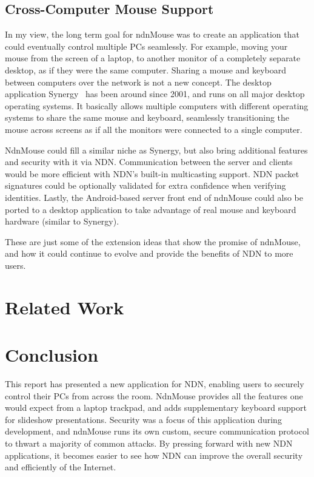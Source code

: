 \documentclass{sig-alternate}
\renewcommand\_{\textunderscore\allowbreak}  %
\begin{document}
\subsection{Cross-Computer Mouse Support}
\label{sec:crossCompMouseSupport}
In my view, the long term goal for ndnMouse was to create an application that could eventually control multiple PCs seamlessly. For example, moving your mouse from the screen of a laptop, to another monitor of a completely separate desktop, as if they were the same computer. Sharing a mouse and keyboard between computers over the network is not a new concept. The desktop application Synergy~\cite{synergy} has been around since 2001, and runs on all major desktop operating systems. It basically allows multiple computers with different operating systems to share the same mouse and keyboard, seamlessly transitioning the mouse across screens as if all the monitors were connected to a single computer.

NdnMouse could fill a similar niche as Synergy, but also bring additional features and security with it via NDN. Communication between the server and clients would be more efficient with NDN's built-in multicasting support. NDN packet signatures could be optionally validated for extra confidence when verifying identities. Lastly, the Android-based server front end of ndnMouse could also be ported to a desktop application to take advantage of real mouse and keyboard hardware (similar to Synergy).

These are just some of the extension ideas that show the promise of ndnMouse, and how it could continue to evolve and provide the benefits of NDN to more users.

\section{Related Work}
\label{sec:relatedwork}


\section{Conclusion}
\label{sec:conclusion}
This report has presented a new application for NDN, enabling users to securely control their PCs from across the room. NdnMouse provides all the features one would expect from a laptop trackpad, and adds supplementary keyboard support for slideshow presentations. Security was a focus of this application during development, and ndnMouse runs its own custom, secure communication protocol to thwart a majority of common attacks. By pressing forward with new NDN applications, it becomes easier to see how NDN can improve the overall security and efficiently of the Internet. 
\end{document}
